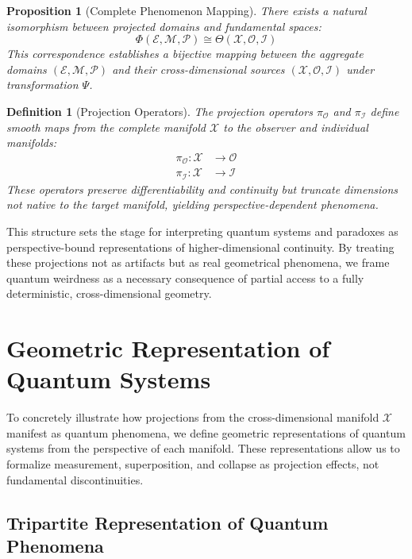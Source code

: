 \documentclass{article}
\newtheorem{definition}{Definition}
\newtheorem{proposition}{Proposition}
\begin{document}
\begin{proposition}[Complete Phenomenon Mapping]
There exists a natural isomorphism between projected domains and fundamental spaces:
\begin{equation}
\Phi(\mathcal{E}, \mathcal{M}, \mathcal{P}) \cong \Theta(\mathcal{X}, \mathcal{O}, \mathcal{I})
\end{equation}
This correspondence establishes a bijective mapping between the aggregate domains $(\mathcal{E}, \mathcal{M}, \mathcal{P})$ and their cross-dimensional sources $(\mathcal{X}, \mathcal{O}, \mathcal{I})$ under transformation $\Psi$.
\end{proposition}

\begin{definition}[Projection Operators]
The projection operators $\pi_{\mathcal{O}}$ and $\pi_{\mathcal{I}}$ define smooth maps from the complete manifold $\mathcal{X}$ to the observer and individual manifolds:
\begin{align}
\pi_{\mathcal{O}}: \mathcal{X} &\to \mathcal{O} \\
\pi_{\mathcal{I}}: \mathcal{X} &\to \mathcal{I}
\end{align}
These operators preserve differentiability and continuity but truncate dimensions not native to the target manifold, yielding perspective-dependent phenomena.
\end{definition}


\noindent
This structure sets the stage for interpreting quantum systems and paradoxes as perspective-bound representations of higher-dimensional continuity. By treating these projections not as artifacts but as real geometrical phenomena, we frame quantum weirdness as a necessary consequence of partial access to a fully deterministic, cross-dimensional geometry.


\section{Geometric Representation of Quantum Systems}

To concretely illustrate how projections from the cross-dimensional manifold $\mathcal{X}$ manifest as quantum phenomena, we define geometric representations of quantum systems from the perspective of each manifold. These representations allow us to formalize measurement, superposition, and collapse as projection effects, not fundamental discontinuities.

\subsection{Tripartite Representation of Quantum Phenomena}
\end{document}
